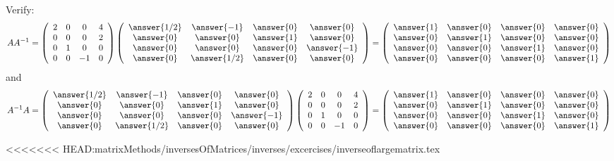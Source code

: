\documentclass{ximera}
\begin{document}
\begin{exercise}
\begin{prompt}
Verify:
\[ A A^{-1} = \left(\begin{array}{cccc}
2 & 0 & 0 & 4\\
0 & 0 &0& 2\\
0& 1 & 0 & 0\\
0 & 0 & -1 & 0
\end{array}\right)\left(\begin{array}{cccc}
\answer{1/2} & \answer{-1} &\answer{0} & \answer{0}\\
 \answer{0} & \answer{0} &\answer{1} & \answer{0}\\
 \answer{0} & \answer{0} &\answer{0} & \answer{-1}\\
 \answer{0} & \answer{1/2} &\answer{0} & \answer{0}
\end{array}\right)= \left(\begin{array}{cccc}
\answer{1} & \answer{0} &\answer{0} & \answer{0}\\
 \answer{0} & \answer{1} &\answer{0} & \answer{0}\\
 \answer{0} & \answer{0} &\answer{1} & \answer{0}\\
 \answer{0} & \answer{0} &\answer{0} & \answer{1}
\end{array}\right)
\]
and
\[A^{-1}A=
\left(\begin{array}{cccc}
\answer{1/2} & \answer{-1} &\answer{0} & \answer{0}\\
 \answer{0} & \answer{0} &\answer{1} & \answer{0}\\
 \answer{0} & \answer{0} &\answer{0} & \answer{-1}\\
 \answer{0} & \answer{1/2} &\answer{0} & \answer{0}
\end{array}\right)\left(\begin{array}{cccc}
2 & 0 & 0 & 4\\
0 & 0 &0& 2\\
0& 1 & 0 & 0\\
0 & 0 & -1 & 0
\end{array}\right)= \left(\begin{array}{cccc}
\answer{1} & \answer{0} &\answer{0} & \answer{0}\\
 \answer{0} & \answer{1} &\answer{0} & \answer{0}\\
 \answer{0} & \answer{0} &\answer{1} & \answer{0}\\
 \answer{0} & \answer{0} &\answer{0} & \answer{1}
\end{array}\right)
\]

\end{prompt}
\end{exercise}
















<<<<<<< HEAD:matrixMethods/inversesOfMatrices/inverses/excercises/inverseoflargematrix.tex
\end{document}
